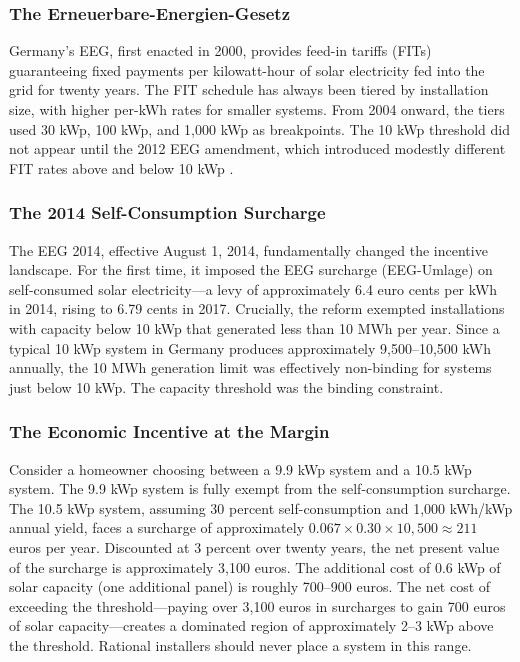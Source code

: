 \documentclass[12pt]{article}
\begin{document}
\subsubsection*{The Erneuerbare-Energien-Gesetz} Germany's EEG, first enacted in 2000, provides feed-in tariffs (FITs) guaranteeing fixed payments per kilowatt-hour of solar electricity fed into the grid for twenty years. The FIT schedule has always been tiered by installation size, with higher per-kWh rates for smaller systems. From 2004 onward, the tiers used 30 kWp, 100 kWp, and 1,000 kWp as breakpoints. The 10 kWp threshold did not appear until the 2012 EEG amendment, which introduced modestly different FIT rates above and below 10 kWp \citep{bundestag2012eeg}.

\subsubsection*{The 2014 Self-Consumption Surcharge} The EEG 2014, effective August 1, 2014, fundamentally changed the incentive landscape. For the first time, it imposed the EEG surcharge (EEG-Umlage) on self-consumed solar electricity---a levy of approximately 6.4 euro cents per kWh in 2014, rising to 6.79 cents in 2017. Crucially, the reform exempted installations with capacity below 10 kWp that generated less than 10 MWh per year. Since a typical 10 kWp system in Germany produces approximately 9,500--10,500 kWh annually, the 10 MWh generation limit was effectively non-binding for systems just below 10 kWp. The capacity threshold was the binding constraint.

\subsubsection*{The Economic Incentive at the Margin} Consider a homeowner choosing between a 9.9 kWp system and a 10.5 kWp system. The 9.9 kWp system is fully exempt from the self-consumption surcharge. The 10.5 kWp system, assuming 30 percent self-consumption and 1,000 kWh/kWp annual yield, faces a surcharge of approximately $0.067 \times 0.30 \times 10{,}500 \approx 211$ euros per year. Discounted at 3 percent over twenty years, the net present value of the surcharge is approximately 3,100 euros. The additional cost of 0.6 kWp of solar capacity (one additional panel) is roughly 700--900 euros. The net cost of exceeding the threshold---paying over 3,100 euros in surcharges to gain 700 euros of solar capacity---creates a dominated region of approximately 2--3 kWp above the threshold. Rational installers should never place a system in this range.
\end{document}
